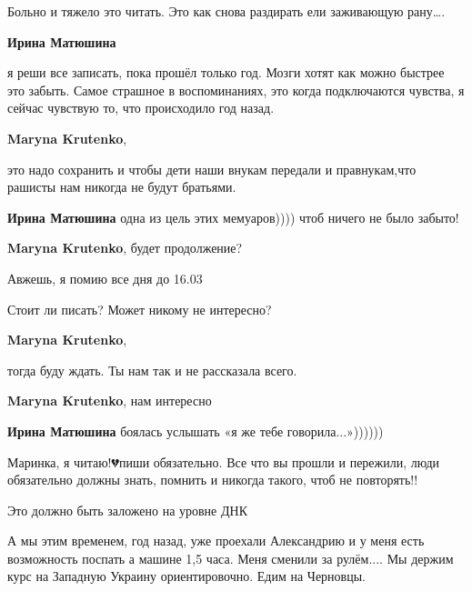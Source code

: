  
 
 
 
 

\qqSecCmt


Больно и тяжело это читать. Это как снова раздирать ели заживающую рану….

\begin{itemize} %
\textbf{Ирина Матюшина} 

я реши все записать, пока прошёл только год. Мозги хотят как можно быстрее это
забыть. Самое страшное в воспоминаниях, это когда подключаются чувства, я
сейчас чувствую то, что происходило год назад.

\textbf{Maryna Krutenko},

это надо сохранить и чтобы дети наши внукам передали и правнукам,что рашисты нам никогда не будут братьями.

\textbf{Ирина Матюшина} одна из цель этих мемуаров)))) чтоб ничего не было забыто!

\textbf{Maryna Krutenko}, будет продолжение?


Авжешь, я помию все дня до 16.03


Стоит ли писать? Может никому не интересно?

\textbf{Maryna Krutenko},

тогда буду ждать. Ты нам так и не рассказала всего.

\textbf{Maryna Krutenko}, нам интересно

\textbf{Ирина Матюшина} боялась услышать «я же тебе говорила...»))))))


Маринка, я читаю!💔пиши обязательно. Все что вы прошли и пережили, люди
обязательно должны знать, помнить и никогда такого, чтоб не повторять!!

Это должно быть заложено на уровне ДНК

\end{itemize} %


А мы этим временем, год назад, уже проехали Александрию и у меня есть
возможность поспать а машине 1,5 часа. Меня сменили за рулём.... Мы держим курс на
Западную Украину ориентировочно. Едим на Черновцы.
